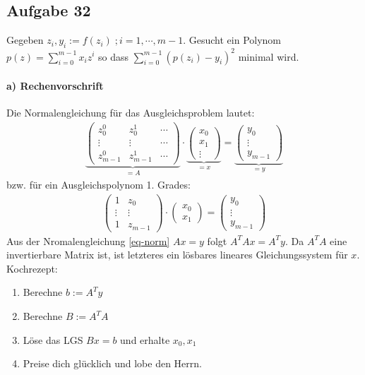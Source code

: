 \subsection*{Aufgabe 32}
Gegeben $z_i,  y_i := f(z_i) \; ; i = 1, \cdots , m-1$. Gesucht ein Polynom
$p(z) = \sum_{i = 0}^{m-1} x_i z^i$ so dass $\sum_{i = 0}^{m-1} (p(z_i) - y_i)^2$
minimal wird.

\paragraph*{a) Rechenvorschrift}
Die Normalengleichung für das Ausgleichsproblem lautet:
\begin{align}
\label{eq-norm}
\underbrace{
  \begin{pmatrix}z_0^0 & z_0^1 & \cdots \\ \vdots & \vdots  & \cdots\\ z_{m-1}^0 & z_{m-1}^1 &\cdots\end{pmatrix}}_{= A} \cdot
\underbrace{
  \begin{pmatrix}x_0 \\ x_1 \\ \vdots  \end{pmatrix}
  }_{= x} =
\underbrace{
  \begin{pmatrix}y_0 \\ \vdots \\y_{m-1}\end{pmatrix}
  }_{= y}
\end{align}
bzw. für ein Ausgleichspolynom 1. Grades:
\begin{align*}
  \begin{pmatrix}1 & z_0 \\ \vdots & \vdots \\ 1 & z_{m-1} \end{pmatrix} \cdot
  \begin{pmatrix}x_0 \\ x_1\end{pmatrix} =
  \begin{pmatrix}y_0 \\ \vdots \\y_{m-1}\end{pmatrix}
\end{align*}
Aus der Nromalengleichung \eqref{eq-norm} $A x = y$ folgt $A^T A x = A^T y$. Da
$A^T A$ eine invertierbare Matrix ist, ist letzteres ein lösbares lineares
Gleichungssystem für $x$. Kochrezept:
\begin{enumerate}
  \item Berechne $b := A^T y$
  \item Berechne $B := A^T A$
  \item Löse das LGS $B x = b$ und erhalte $x_0, x_1$
  \item Preise dich glücklich und lobe den Herrn.
\end{enumerate}

